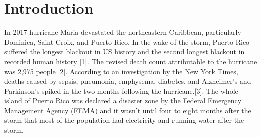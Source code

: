 \chapter{Introduction}
In 2017 hurricane Maria devastated the northeastern Caribbean, particularly Dominica, Saint Croix, and Puerto Rico. In the wake of the storm, Puerto Rico suffered the longest blackout in US history and the second longest blackout in recorded human history [1]. The revised death count attributable to the hurricane was 2,975 people [2]. According to an investigation by the New York Times, deaths caused by  sepsis, pneumonia, emphysema, diabetes, and Alzheimer's and Parkinson's spiked in the two months following the hurricane.[3]. The whole island of Puerto Rico was declared a disaster zone by the Federal Emergency Management Agency (FEMA) and it wasn't until four to eight months after the storm that most of the population had electricity and running water after the storm.
